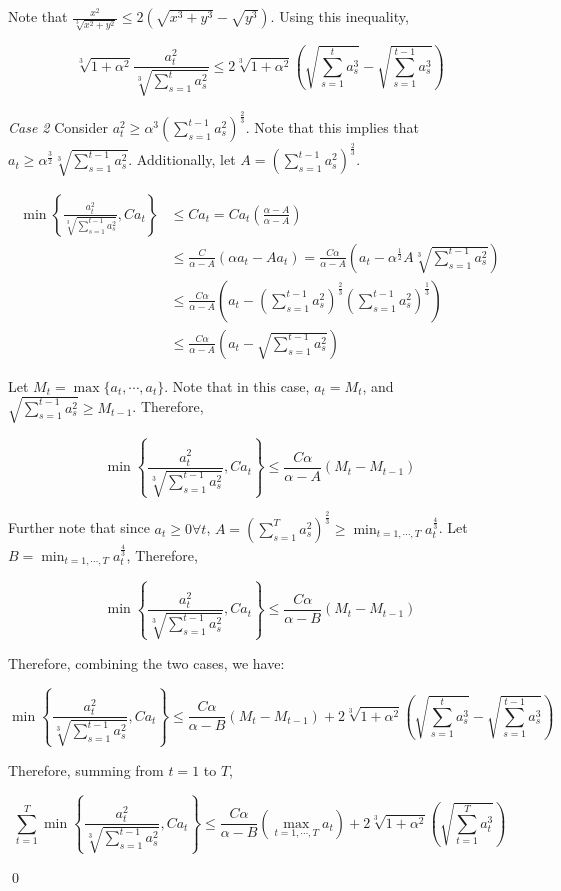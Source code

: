 \documentclass{article}
\begin{document}
Note that $\frac{x^2}{\sqrt[3]{x^2 + y^2}} \leq 2(\sqrt{x^3 + y^3} - \sqrt{y^3})$. Using this inequality,

\[
  \sqrt[3]{1 + \alpha^2} \frac{a_{t}^2}{\sqrt[3]{\sum\limits_{s=1}^t a_{s}^2}} \leq 2 \sqrt[3]{1 +
  \alpha^2}\left(\sqrt{\sum\limits_{s=1}^t a_{s}^3} - \sqrt{\sum\limits_{s=1}^{t-1} a_{s}^3}\right)
\]

\emph{Case 2} Consider $a_{t}^2 \geq \alpha^3 \left(\sum\limits_{s=1}^{t-1} a_{s}^2\right)^\frac{2}{3}$. Note that this
implies that $a_t \geq \alpha^\frac{3}{2} \sqrt[3]{\sum\limits_{s=1}^{t-1} a_{s}^2}$. Additionally, let 
$A = \left( \sum\limits_{s=1}^{t-1} a_{s}^2 \right)^\frac{2}{3}$.


\begin{align*}
  \min \left\{ \frac{a_{t}^2}{\sqrt[3]{\sum\limits_{s=1}^{t-1} a_{s}^2}}, C a_t \right\}
  &\leq C a_t = C a_t \left(\frac{\alpha - A}{\alpha -A}\right) \\
  &\leq \frac{C}{\alpha - A}\left(\alpha a_t - A a_t\right) = \frac{C \alpha}{\alpha - A}\left(a_t - \alpha^\frac{1}{2}
    A \sqrt[3]{\sum\limits_{s=1}^{t-1} a_{s}^2}\right) \\
  &\leq \frac{C \alpha}{\alpha - A}\left(a_t - \left( \sum\limits_{s=1}^{t-1} a_{s}^2 \right)^\frac{2}{3}
  \left(\sum\limits_{s=1}^{t-1} a_{s}^2\right)^\frac{1}{3}\right) \\
  &\leq \frac{C \alpha}{\alpha - A}\left(a_t - \sqrt{\sum\limits_{s=1}^{t-1} a_{s}^2}\right)
\end{align*}

Let $M_t = \max \{a_t, \cdots, a_t\}$. Note that in this case, $a_t = M_t$, and $\sqrt{\sum\limits_{s=1}^{t-1} a_{s}^2}
\geq M_{t-1}$. Therefore,

\[
  \min \left\{ \frac{a_{t}^2}{\sqrt[3]{\sum\limits_{s=1}^{t-1} a_{s}^2}}, C a_t \right\} \leq 
  \frac{C \alpha}{\alpha - A}\left(M_t - M_{t-1}\right)
\]

Further note that since $a_t \geq 0 \forall t$, $A = (\sum\limits_{s=1}^T a_{s}^2)^\frac{2}{3} \geq
\min_{t=1,\cdots,T}a_{t}^\frac{4}{3}$. Let $B = \min_{t=1,\cdots,T}a_{t}^\frac{4}{3}$, Therefore,

\[
  \min \left\{ \frac{a_{t}^2}{\sqrt[3]{\sum\limits_{s=1}^{t-1} a_{s}^2}}, C a_t \right\} \leq 
  \frac{C \alpha}{\alpha - B}\left(M_t - M_{t-1}\right)
\]

Therefore, combining the two cases, we have:

\[
  \min \left\{ \frac{a_{t}^2}{\sqrt[3]{\sum\limits_{s=1}^{t-1} a_{s}^2}}, C a_t \right\} \leq \frac{C \alpha}{\alpha -
  B}\left(M_t - M_{t-1}\right) + 2 \sqrt[3]{1 + \alpha^2}\left(\sqrt{\sum\limits_{s=1}^t a_{s}^3} -
  \sqrt{\sum\limits_{s=1}^{t-1} a_{s}^3}\right)
\]

Therefore, summing from $t=1$ to $T$,

\[
  \sum\limits_{t=1}^T\min \left\{ \frac{a_{t}^2}{\sqrt[3]{\sum\limits_{s=1}^{t-1} a_{s}^2}}, C a_t \right\} \leq \frac{C
  \alpha}{\alpha - B}\left(\max\limits_{t=1, \cdots, T} a_t\right) + 2 \sqrt[3]{1 +
  \alpha^2}\left(\sqrt{\sum\limits_{t=1}^T a_{t}^3}\right)
\]

\qed
\end{document}
